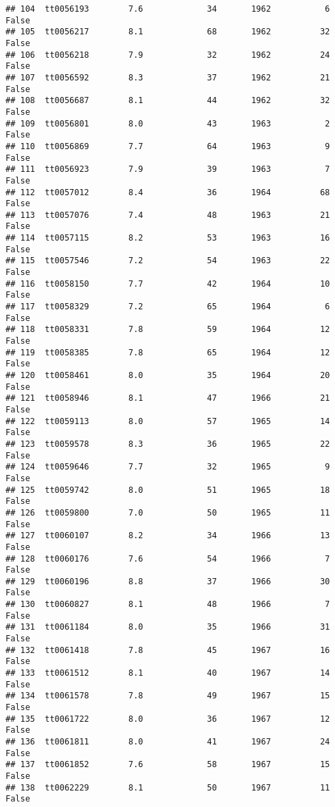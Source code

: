 \documentclass[
]{article}
\begin{document}
\begin{verbatim}
## 104  tt0056193        7.6             34       1962           6   False
## 105  tt0056217        8.1             68       1962          32   False
## 106  tt0056218        7.9             32       1962          24   False
## 107  tt0056592        8.3             37       1962          21   False
## 108  tt0056687        8.1             44       1962          32   False
## 109  tt0056801        8.0             43       1963           2   False
## 110  tt0056869        7.7             64       1963           9   False
## 111  tt0056923        7.9             39       1963           7   False
## 112  tt0057012        8.4             36       1964          68   False
## 113  tt0057076        7.4             48       1963          21   False
## 114  tt0057115        8.2             53       1963          16   False
## 115  tt0057546        7.2             54       1963          22   False
## 116  tt0058150        7.7             42       1964          10   False
## 117  tt0058329        7.2             65       1964           6   False
## 118  tt0058331        7.8             59       1964          12   False
## 119  tt0058385        7.8             65       1964          12   False
## 120  tt0058461        8.0             35       1964          20   False
## 121  tt0058946        8.1             47       1966          21   False
## 122  tt0059113        8.0             57       1965          14   False
## 123  tt0059578        8.3             36       1965          22   False
## 124  tt0059646        7.7             32       1965           9   False
## 125  tt0059742        8.0             51       1965          18   False
## 126  tt0059800        7.0             50       1965          11   False
## 127  tt0060107        8.2             34       1966          13   False
## 128  tt0060176        7.6             54       1966           7   False
## 129  tt0060196        8.8             37       1966          30   False
## 130  tt0060827        8.1             48       1966           7   False
## 131  tt0061184        8.0             35       1966          31   False
## 132  tt0061418        7.8             45       1967          16   False
## 133  tt0061512        8.1             40       1967          14   False
## 134  tt0061578        7.8             49       1967          15   False
## 135  tt0061722        8.0             36       1967          12   False
## 136  tt0061811        8.0             41       1967          24   False
## 137  tt0061852        7.6             58       1967          15   False
## 138  tt0062229        8.1             50       1967          11   False

\end{verbatim}
\end{document}
